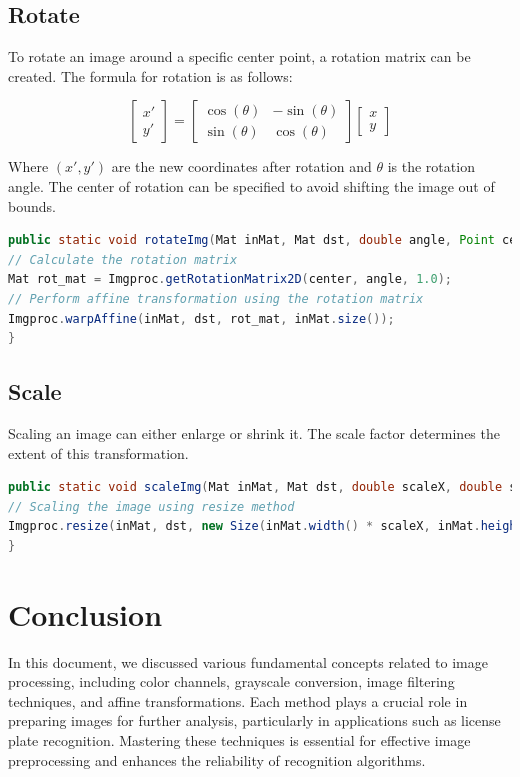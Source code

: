 \documentclass{article}
\begin{document}
\subsection{Rotate}
To rotate an image around a specific center point, a rotation matrix can be created. The formula for rotation is as follows:

\[
\begin{bmatrix}
x' \\
y'
\end{bmatrix}
=
\begin{bmatrix}
\cos(\theta) & -\sin(\theta) \\
\sin(\theta) & \cos(\theta)
\end{bmatrix}
\begin{bmatrix}
x \\
y
\end{bmatrix}
\]

Where \((x', y')\) are the new coordinates after rotation and \(\theta\) is the rotation angle. The center of rotation can be specified to avoid shifting the image out of bounds.

\begin{lstlisting}[language=Java]
public static void rotateImg(Mat inMat, Mat dst, double angle, Point center) {
// Calculate the rotation matrix
Mat rot_mat = Imgproc.getRotationMatrix2D(center, angle, 1.0);
// Perform affine transformation using the rotation matrix
Imgproc.warpAffine(inMat, dst, rot_mat, inMat.size());
}
\end{lstlisting}

\subsection{Scale}
Scaling an image can either enlarge or shrink it. The scale factor determines the extent of this transformation.

\begin{lstlisting}[language=Java]
public static void scaleImg(Mat inMat, Mat dst, double scaleX, double scaleY) {
// Scaling the image using resize method
Imgproc.resize(inMat, dst, new Size(inMat.width() * scaleX, inMat.height() * scaleY));
}
\end{lstlisting}

\section{Conclusion}
In this document, we discussed various fundamental concepts related to image processing, including color channels, grayscale conversion, image filtering techniques, and affine transformations. Each method plays a crucial role in preparing images for further analysis, particularly in applications such as license plate recognition. Mastering these techniques is essential for effective image preprocessing and enhances the reliability of recognition algorithms.
\end{document}
